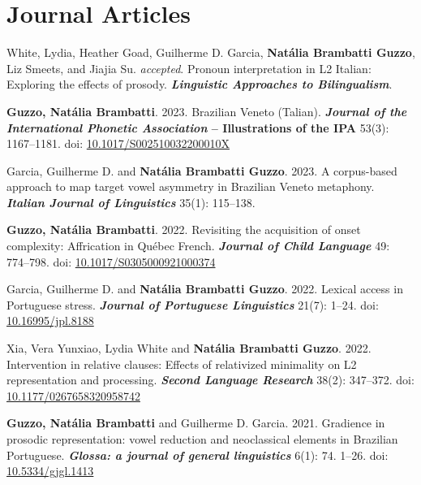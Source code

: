 \documentclass[letterpaper,10pt]{article}
\begin{document}
\vspace{0.3cm}




\section{Journal Articles}

 White, Lydia, Heather Goad, Guilherme D. Garcia, \textbf{Nat\'alia Brambatti Guzzo}, Liz Smeets, and Jiajia Su. \emph{accepted}. Pronoun interpretation in L2 Italian: Exploring the effects of prosody. \textbf{\emph{Linguistic Approaches to Bilingualism}}.

 \textbf{Guzzo, Nat\'alia Brambatti}. 2023. Brazilian Veneto (Talian). \textbf{\emph{Journal of the International Phonetic Association} -- Illustrations of the IPA} 53(3): 1167--1181. doi: \href{https://doi.org/10.1017/S002510032200010X}{10.1017/S002510032200010X}

 Garcia, Guilherme D. and \textbf{Nat\'alia Brambatti Guzzo}. 2023. A corpus-based approach to map target vowel asymmetry in Brazilian Veneto metaphony. \textbf{\emph{Italian Journal of Linguistics}} 35(1): 115--138.

 \textbf{Guzzo, Nat\'alia Brambatti}. 2022. Revisiting the acquisition of onset complexity: Affrication in Qu\'ebec French. \textbf{\emph{Journal of Child Language}} 49: 774--798. doi: \href{https://doi.org/10.1017/S0305000921000374}{10.1017/S0305000921000374}

 Garcia, Guilherme D. and \textbf{Nat\'alia Brambatti Guzzo}. 2022. Lexical access in Portuguese stress. \textbf{\emph{Journal of Portuguese Linguistics}} 21(7): 1--24. doi: \href{https://doi.org/10.16995/jpl.8188}{10.16995/jpl.8188}

 Xia, Vera Yunxiao, Lydia White and \textbf{Nat\'alia Brambatti Guzzo}. 2022. Intervention in relative clauses: Effects of relativized minimality on L2 representation and processing. \textbf{\emph{Second Language Research}} 38(2): 347--372. doi: \href{https://doi.org/10.1177/0267658320958742}{10.1177/0267658320958742}

 \textbf{Guzzo, Nat\'alia Brambatti} and Guilherme D. Garcia. 2021. Gradience in prosodic representation: vowel reduction and neoclassical elements in Brazilian Portuguese. \textbf{\emph{Glossa: a journal of general linguistics}} 6(1): 74. 1--26. doi: \href{https://doi. org/10.5334/gjgl.1413}{10.5334/gjgl.1413}
\end{document}
